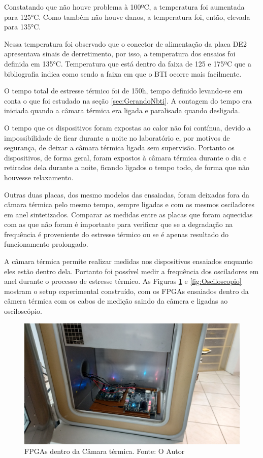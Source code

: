 Constatando que não houve problema à 100ºC, a temperatura foi aumentada para 125°C. Como também não houve danos, a temperatura foi, então, elevada para 135°C.

Nessa temperatura foi observado que o conector de alimentação da placa DE2 apresentava sinais de derretimento, por isso, a temperatura dos ensaios foi definida em 135°C. Temperatura que está dentro da faixa de 125 e 175ºC que a bibliografia indica como sendo a faixa em que o BTI ocorre mais facilmente.

O tempo total de estresse térmico foi de 150h, tempo definido levando-se em conta o que foi estudado na seção \ref{sec:GerandoNbti}. A contagem do tempo era iniciada quando a câmara térmica era ligada e paralisada quando desligada.

O tempo que os dispositivos foram expostas ao calor não foi contínua, devido a impossibilidade de ficar durante a noite no laboratório e, por motivos de segurança, de deixar a câmara térmica ligada sem supervisão. Portanto os dispositivos, de forma geral, foram expostos à câmara térmica durante o dia e retirados dela durante a noite, ficando ligados o tempo todo, de forma que não houvesse relaxamento.

Outras duas placas, dos mesmo modelos das ensaiadas, foram deixadas fora da câmara térmica pelo mesmo tempo, sempre ligadas e com os mesmos osciladores em anel sintetizados. Comparar as medidas entre as placas que foram aquecidas com as que não foram é importante para verificar que se a degradação na frequência é proveniente do estresse térmico ou se é apenas resultado do funcionamento prolongado.

A câmara térmica permite realizar medidas nos dispositivos ensaiados enquanto eles estão dentro dela. Portanto foi possível medir a frequência dos osciladores em anel durante o processo de estresse térmico. As Figuras \ref{fig:CamTerm} e \ref{fig:Osciloscopio} mostram o setup experimental construído, com os FPGAs ensaiados dentro da câmera térmica com os cabos de medição saindo da câmera e ligadas ao osciloscópio.

\begin{figure}[H]
    \centering
    \includegraphics[width=\linewidth]{figures/Metodologia/Ensaios_FpgasNoForno.jpg}
    \caption{FPGAs dentro da Câmara térmica. Fonte: O Autor}
    \label{fig:CamTerm}
\end{figure}

